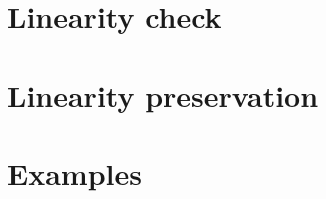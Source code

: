 \documentclass{mproj}
\begin{document}
\section{Linearity check}\label{linearity-check}

\section{Linearity preservation}\label{linearity-preservation}

\section{Examples}\label{examples}
\end{document}
